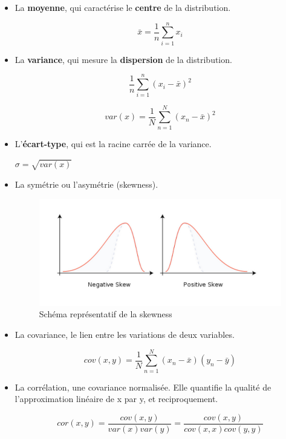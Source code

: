 \documentclass{article}
\begin{document}
\begin{itemize}
\item La \textbf{moyenne}, qui caractérise le \textbf{centre} de la distribution.

\[ \bar{x} = \frac{1}{n} \sum_{i=1}^{n} x_i \]

\item La \textbf{variance}, qui mesure la \textbf{dispersion} de la distribution.


\[ \frac{1}{n} \sum_{i=1}^{n} (x_i - \bar{x})^{2} \]

\[ var(x) = \frac{1}{N} \sum_{n=1}^{N} (x_n - \bar{x})^2 \]


\item L'\textbf{écart-type}, qui est la racine carrée de la variance.

$\sigma = \sqrt{var(x)}$

\item La symétrie ou l'asymétrie (skewness).

\begin{figure}[H]
   \caption{Schéma représentatif de la skewness}
    \begin{center} \includegraphics[scale=0.4]{skewness.png} \end{center}
\end{figure}


\item La covariance, le lien entre les variations de deux variables.

\[ cov(x, y) = \frac{1}{N} \sum_{n=1}^{N} (x_n - \bar{x}) (y_n - \bar{y}) \]

\item La corrélation, une covariance normalisée. Elle quantifie la qualité de l'approximation linéaire de x par y, et reciproquement.

\[ cor(x, y) = \frac{cov(x, y)}{var(x) var(y)} = \frac{cov(x, y)}{cov(x, x) cov(y, y)} \]


\end{itemize}
\end{document}
